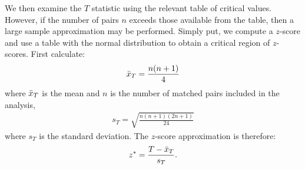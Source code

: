 We then examine the $T$ statistic using the relevant table of critical values. However, if the number of pairs $n$ exceeds those available from the table, then a large sample approximation may be performed. Simply put, we compute a $z$-score and use a table with the normal distribution to obtain a critical region of $z$-scores. First calculate:
\begin{align}
    \Bar{x}_T = \frac{n(n + 1)}{4}
\end{align}
where $\Bar{x}_T$ is the mean and $n$ is the number of matched pairs included in the analysis,
\begin{align}
    s_T = \sqrt{\frac{n(n + 1)(2n + 1)}{24}}
\end{align}
where $s_T$ is the standard deviation. The $z$-score approximation is therefore:
\begin{align}
    z^{*} = \frac{T - \Bar{x}_T}{s_T}.
\end{align}

